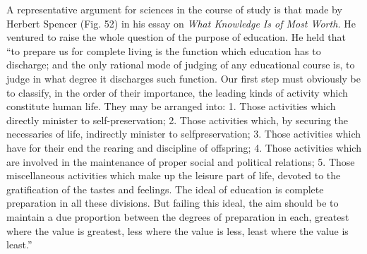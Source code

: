 \documentclass[]{book}
\begin{document}
A representative argument for sciences in the course of study is that made by Herbert Spencer (Fig. 52) in his essay on \emph{What Knowledge Is of Most Worth.} He ventured to raise the whole question of the purpose of education. He held that ``to prepare us for complete living is the function which education has to discharge; and the only rational mode of judging of any educational course is, to judge in what degree it discharges such function. Our first step must obviously be to classify, in the order of their importance, the leading kinds of activity which constitute human life. They may be arranged into: 1. Those activities which directly minister to self-preservation; 2. Those activities which, by securing the necessaries of life, indirectly minister to selfpreservation; 3. Those activities which have for their end the rearing and discipline of offspring; 4. Those activities which are involved in the maintenance of proper social and political relations; 5. Those miscellaneous activities which make up the leisure part of life, devoted to the gratification of the tastes and feelings. The ideal of education is complete preparation in all these divisions. But failing this ideal, the aim should be to maintain a due proportion between the degrees of preparation in each, greatest where the value is greatest, less where the value is less, least where the value is least.''
\end{document}
